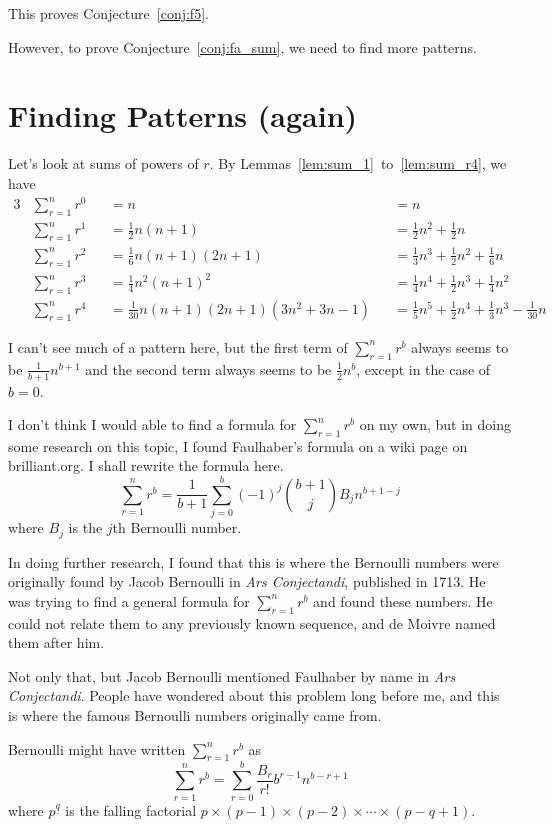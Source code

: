 \documentclass[a4paper]{article}
\newcommand{\sn}{\sum\limits_{r=1}^{n}}
\newcommand{\oo}[1]{\frac{1}{#1}}
\begin{document}
This proves Conjecture~\ref{conj:f5}.

However, to prove Conjecture~\ref{conj:fa_sum}, we need to find more patterns.

\section{Finding Patterns (again)}

Let's look at sums of powers of $r$. By Lemmas~\ref{lem:sum_1}~to~\ref{lem:sum_r4}, we have
\begin{alignat*}{3}
&\sn r^0 &&= n &&= n\\
&\sn r^1 &&= \oo{2}n(n + 1) &&= \oo{2}n^2 + \oo{2}n\\
&\sn r^2 &&= \oo{6}n(n + 1)(2n + 1) &&= \oo{3}n^3 + \oo{2}n^2 + \oo{6}n\\
&\sn r^3 &&= \oo{4}n^2(n + 1)^2 &&= \oo{4}n^4 + \oo{2}n^3 + \oo{4}n^2\\
&\sn r^4 &&= \oo{30}n(n + 1)(2n + 1)\left(3n^2 + 3n - 1\right) &&= \oo{5}n^5 + \oo{2}n^4 + \oo{3}n^3 - \oo{30}n
\end{alignat*}

I can't see much of a pattern here, but the first term of $\sn r^b$ always seems to be $\oo{b+1}n^{b+1}$ and the second term always seems to be $\oo{2}n^{b}$, except in the case of $b = 0$.

I don't think I would able to find a formula for $\sn r^b$ on my own, but in doing some research on this topic, I found Faulhaber's formula on a wiki page on brilliant.org\cite{brilliant.org-sums-wiki}. I shall rewrite the formula here. $$\sn r^b = \oo{b+1} \sum_{j=0}^b (-1)^j \binom{b+1}{j} B_j n^{b+1-j}$$ where $B_j$ is the $j$th Bernoulli number.

In doing further research, I found that this is where the Bernoulli numbers were originally found by Jacob Bernoulli in \textit{Ars Conjectandi}, published in 1713. He was trying to find a general formula for $\sn r^b$ and found these numbers. He could not relate them to any previously known sequence, and de Moivre named them after him.\cite{wikipedia-bernoulli-numbers}

Not only that, but Jacob Bernoulli mentioned Faulhaber by name in \textit{Ars Conjectandi}. People have wondered about this problem long before me, and this is where the famous Bernoulli numbers originally came from.

Bernoulli might have written $\sn r^b$ as $$\sn r^b = \sum_{r=0}^b \frac{B_r}{r!} b^{\underline{r-1}} n^{b-r+1}$$ where $p^{\underline{q}}$ is the falling factorial $p \times (p-1) \times (p-2) \times \cdots \times (p-q+1)$.
\end{document}
